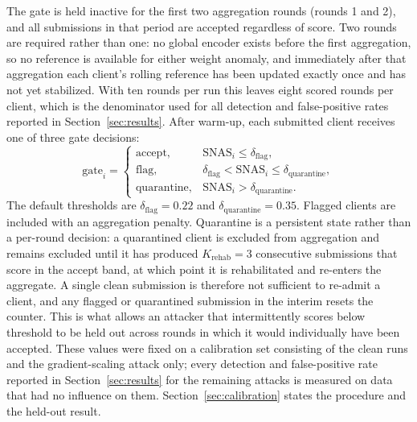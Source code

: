 \documentclass[pdflatex,sn-mathphys-num]{sn-jnl}
\begin{document}
The gate is held inactive for the first two aggregation rounds (rounds 1 and 2), and all submissions in that period are accepted regardless of score. Two rounds are required rather than one: no global encoder exists before the first aggregation, so no reference is available for either weight anomaly, and immediately after that aggregation each client's rolling reference has been updated exactly once and has not yet stabilized. With ten rounds per run this leaves eight scored rounds per client, which is the denominator used for all detection and false-positive rates reported in Section~\ref{sec:results}. After warm-up, each submitted client receives one of three gate decisions:
\begin{equation}
    \mathrm{gate}_i=\begin{cases}
        \mathrm{accept}, & \mathrm{SNAS}_i\leq \delta_{\mathrm{flag}},\\
        \mathrm{flag}, & \delta_{\mathrm{flag}} < \mathrm{SNAS}_i\leq \delta_{\mathrm{quarantine}},\\
        \mathrm{quarantine}, & \mathrm{SNAS}_i > \delta_{\mathrm{quarantine}}.
    \end{cases}
\end{equation}
The default thresholds are $\delta_{\mathrm{flag}}=0.22$ and $\delta_{\mathrm{quarantine}}=0.35$. Flagged clients are included with an aggregation penalty. Quarantine is a persistent state rather than a per-round decision: a quarantined client is excluded from aggregation and remains excluded until it has produced $K_{\mathrm{rehab}}=3$ consecutive submissions that score in the accept band, at which point it is rehabilitated and re-enters the aggregate. A single clean submission is therefore not sufficient to re-admit a client, and any flagged or quarantined submission in the interim resets the counter. This is what allows an attacker that intermittently scores below threshold to be held out across rounds in which it would individually have been accepted. These values were fixed on a calibration set consisting of the clean runs and the gradient-scaling attack only; every detection and false-positive rate reported in Section~\ref{sec:results} for the remaining attacks is measured on data that had no influence on them. Section~\ref{sec:calibration} states the procedure and the held-out result.
\end{document}
